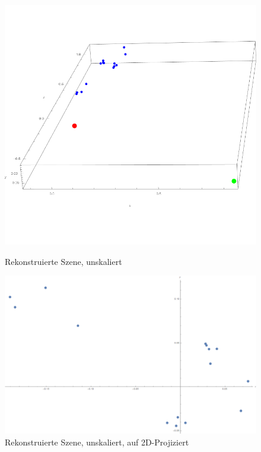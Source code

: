 \begin{figure}[!htb]
	\includegraphics[width=\linewidth]{images/reconstructed_Points_Same_Resolutions.png}
	\caption{Rekonstruierte Szene, unskaliert}
	\label{fig:awesome_image1}
	\endminipage\hfill
	\includegraphics[width=\linewidth]{images/reconstructed_Points_Same_Resolutions2D.png}
	\caption{Rekonstruierte Szene, unskaliert, auf 2D-Projiziert}
	\label{fig:awesome_image2}
	\endminipage\hfill
\end{figure}






